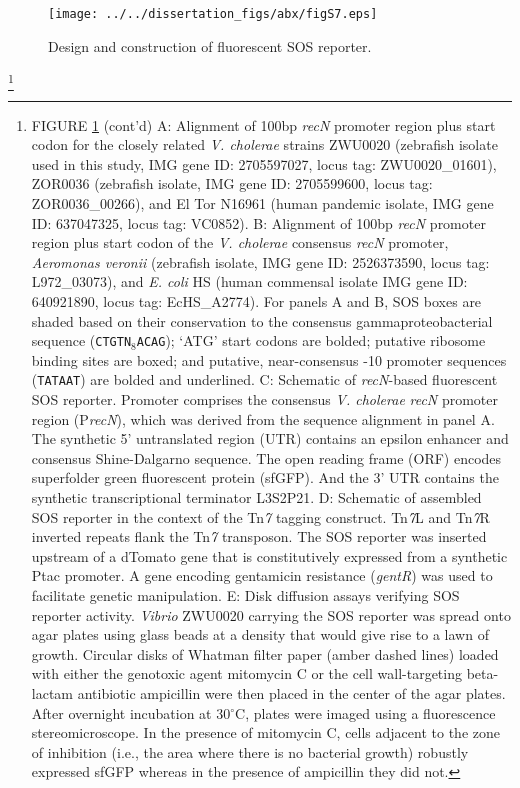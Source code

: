 {{{\begin{figure}[H]
	\centerline{
		\texttt{[image: ../../dissertation\_figs/abx/figS7.eps]}} 
	\caption{Design and construction of fluorescent SOS reporter.}
	\label{fig:figS7}
\end{figure}
{\let\thefootnote\relax\footnote{FIGURE \ref{fig:figS7} (cont'd) A: Alignment of 100bp \textit{recN} promoter region plus start codon for the closely related \textit{V. cholerae} strains ZWU0020 (zebrafish isolate used in this study, IMG gene ID: 2705597027, locus tag: ZWU0020\_01601), ZOR0036 (zebrafish isolate, IMG gene ID: 2705599600, locus tag: ZOR0036\_00266), and El Tor N16961 (human pandemic isolate, IMG gene ID: 637047325, locus tag: VC0852). B: Alignment of 100bp \textit{recN} promoter region plus start codon of the \textit{V. cholerae} consensus \textit{recN} promoter, \textit{Aeromonas veronii} (zebrafish isolate, IMG gene ID: 2526373590, locus tag: L972\_03073), and \textit{E. coli} HS (human commensal isolate IMG gene ID: 640921890, locus tag: EcHS\_A2774). For panels A and B, SOS boxes are shaded based on their conservation to the consensus gammaproteobacterial sequence (\texttt{CTGTN$_8$ACAG}); `ATG' start codons are bolded; putative ribosome binding sites are boxed; and putative, near-consensus -10 promoter sequences (\texttt{TATAAT}) are bolded and underlined. C: Schematic of \textit{recN}-based fluorescent SOS reporter. Promoter comprises the consensus \textit{V. cholerae} \textit{recN} promoter region (P\textit{recN}), which was derived from the sequence alignment in panel A. The synthetic 5' untranslated region (UTR) contains an epsilon enhancer and consensus Shine-Dalgarno sequence. The open reading frame (ORF) encodes superfolder green fluorescent protein (sfGFP). And the 3' UTR contains the synthetic transcriptional terminator L3S2P21. D: Schematic of assembled SOS reporter in the context of the Tn\textit{7} tagging construct. Tn\textit{7}L and Tn\textit{7}R inverted repeats flank the Tn\textit{7} transposon. The SOS reporter was inserted upstream of a dTomato gene that is constitutively expressed from a synthetic Ptac promoter. A gene encoding gentamicin resistance (\textit{gentR}) was used to facilitate genetic manipulation. E: Disk diffusion assays verifying SOS reporter activity. \textit{Vibrio} ZWU0020 carrying the SOS reporter was spread onto agar plates using glass beads at a density that would give rise to a lawn of growth. Circular disks of Whatman filter paper (amber dashed lines) loaded with either the genotoxic agent mitomycin C or the cell wall-targeting beta-lactam antibiotic ampicillin were then placed in the center of the agar plates. After overnight incubation at 30$^{\circ}$C, plates were imaged using a fluorescence stereomicroscope. In the presence of mitomycin C, cells adjacent to the zone of inhibition (i.e., the area where there is no bacterial growth) robustly expressed sfGFP whereas in the presence of ampicillin they did not.}

}}}}
